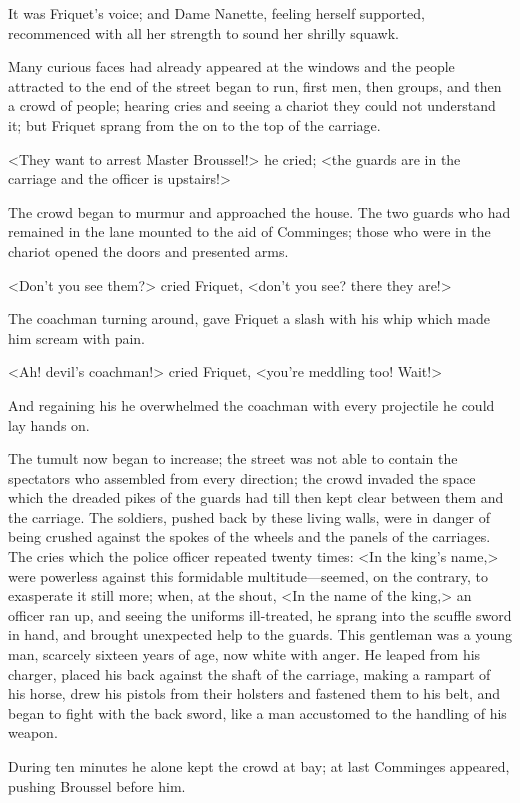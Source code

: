 It was Friquet's voice; and Dame Nanette, feeling herself supported, recommenced with all her strength to sound her shrilly squawk.

Many curious faces had already appeared at the windows and the people attracted to the end of the street began to run, first men, then groups, and then a crowd of people; hearing cries and seeing a chariot they could not understand it; but Friquet sprang from the  on to the top of the carriage.

<They want to arrest Master Broussel!> he cried; <the guards are in the carriage and the officer is upstairs!>

The crowd began to murmur and approached the house. The two guards who had remained in the lane mounted to the aid of Comminges; those who were in the chariot opened the doors and presented arms.

<Don't you see them?> cried Friquet, <don't you see? there they are!>

The coachman turning around, gave Friquet a slash with his whip which made him scream with pain.

<Ah! devil's coachman!> cried Friquet, <you're meddling too! Wait!>

And regaining his  he overwhelmed the coachman with every projectile he could lay hands on.

The tumult now began to increase; the street was not able to contain the spectators who assembled from every direction; the crowd invaded the space which the dreaded pikes of the guards had till then kept clear between them and the carriage. The soldiers, pushed back by these living walls, were in danger of being crushed against the spokes of the wheels and the panels of the carriages. The cries which the police officer repeated twenty times: <In the king's name,> were powerless against this formidable multitude—seemed, on the contrary, to exasperate it still more; when, at the shout, <In the name of the king,> an officer ran up, and seeing the uniforms ill-treated, he sprang into the scuffle sword in hand, and brought unexpected help to the guards. This gentleman was a young man, scarcely sixteen years of age, now white with anger. He leaped from his charger, placed his back against the shaft of the carriage, making a rampart of his horse, drew his pistols from their holsters and fastened them to his belt, and began to fight with the back sword, like a man accustomed to the handling of his weapon.

During ten minutes he alone kept the crowd at bay; at last Comminges appeared, pushing Broussel before him.

